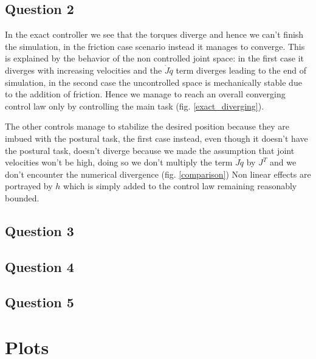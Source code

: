 \documentclass[10pt]{article}
\begin{document}
\subsection{Question 2}

In the exact controller we see that the torques diverge and hence we can't finish the simulation, in the friction case scenario instead it manages to converge. This is explained by the behavior of the non controlled joint space: in the first case it diverges with increasing velocities and the $\dot J \dot q$ term diverges leading to the end of simulation, in the second case the uncontrolled space is mechanically stable due to the addition of friction. Hence we manage to reach an overall converging control law only by controlling the main task (fig. \ref{exact_diverging}).

The other controls manage to stabilize the desired position because they are imbued with the postural task, the first case instead, even though it doesn't have the postural task, doesn't diverge because we made the assumption that joint velocities won't be high, doing so we don't multiply the term $\dot J \dot q$ by $J^T$ and we don't encounter the numerical divergence (fig. \ref{comparison}) Non linear effects are portrayed by $h$ which is simply added to the control law remaining reasonably bounded.
\subsection{Question 3}
\subsection{Question 4}
\subsection{Question 5}

\pagebreak

\section{Plots}
\end{document}
